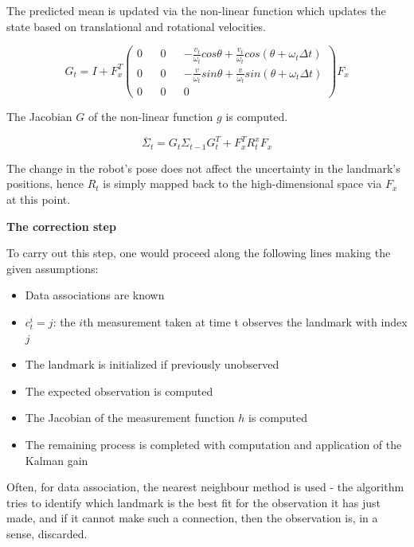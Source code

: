 \documentclass[a4paper]{article}
\begin{document}
The predicted mean is updated via the non-linear function which updates the state based on translational and rotational velocities.

\begin{equation*}
    G_t = I + F_x^T 
    \begin{pmatrix}
        0 && 0 && - \frac{v_t}{\omega_t} cos\theta + \frac{v_t}{\omega_t} cos (\theta + \omega_t \Delta t)
        \\ 
        0 && 0 && - \frac{v}{\omega_t} sin\theta + \frac{v}{\omega_t} sin (\theta + \omega_t \Delta t) 
        \\ 
        0 && 0 && 0
    \end{pmatrix} 
    F_x
\end{equation*}

The Jacobian $G$ of the non-linear function $g$ is computed.

\begin{equation*}
    \overline{\Sigma}_t = G_t \Sigma_{t-1} G_t^T + F_x^T R_t^x F_x
\end{equation*}

The change in the robot's pose does not affect the uncertainty in the landmark's positions, hence $R_t$ is simply mapped back to the high-dimensional space via $F_x$ at this point.

\textbf{The correction step}

To carry out this step, one would proceed along the following lines making the given assumptions:

\begin{itemize}
    \item Data associations are known
    \item $c_t^i = j$: the $i$th measurement taken at time t observes the landmark with index $j$
    \item The landmark is initialized if previously unobserved
    \item The expected observation is computed
    \item The Jacobian of the measurement function $h$ is computed
    \item The remaining process is completed with computation and application of the Kalman gain
\end{itemize}

Often, for data association, the nearest neighbour method is used - the algorithm tries to identify which landmark is the best fit for the observation it has just made, and if it cannot make such a connection, then the observation is, in a sense, discarded.
\end{document}
